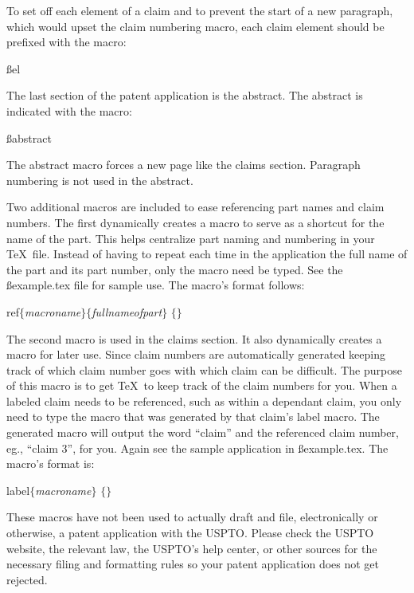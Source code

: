 To set off each element of a claim and to prevent the start of a new
paragraph, which would upset the claim numbering macro, each claim
element should be prefixed with the macro:

\ss\bs el
\rm

The last section of the patent application is the abstract.  The abstract
is indicated with the macro:

\ss\bs abstract
\rm

The abstract macro forces a new page like the claims section. 
Paragraph numbering is not used in the abstract.


Two additional macros are included to ease referencing part names and
claim numbers.  The first dynamically creates a macro to serve as a
shortcut for the name of the part.  This helps centralize part naming
and numbering in your \TeX\ file.  Instead of having to repeat each time
in the application the full name of the part and its part number, only
the macro need be typed.  See the \ss example.tex\rm{} file for
sample use.  The macro's format follows:

\indent   \bs ref$\{${\it macroname}$\}$$\{${\it fullnameofpart}$\}$\nl
\indent   {}$\{$$\}$
          \rm

The second macro is used in the claims section.  It also dynamically
creates a macro for later use.  Since claim numbers are automatically
generated keeping track of which claim number goes with which claim
can be difficult.  The purpose of this macro is to get \TeX\ to keep
track of the claim numbers for you.  When a labeled claim needs to be
referenced, such as within a dependant claim, you only need to type
the macro that was generated by that claim's label macro.  The
generated macro will output the word ``claim'' and the referenced
claim number, eg., ``claim 3'', for you.  Again see the sample
application in \ss example.tex\rm.  The macro's format is:

\indent   \bs label$\{${\it macroname}$\}$\nl
\indent   {}$\{$$\}$
          \rm



These macros have not been used to actually draft and file,
electronically or otherwise, a patent application with the USPTO.
Please check the USPTO website, the relevant law, the USPTO's help
center, or other sources for the necessary filing and formatting
rules so your patent application does not get rejected.

